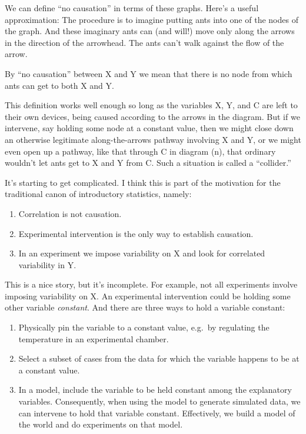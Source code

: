 \documentclass[nofonts,]{tufte-handout}
\providecommand{\tightlist}{%
  \setlength{\itemsep}{0pt}\setlength{\parskip}{0pt}}
\begin{document}
We can define ``no causation'' in terms of these graphs. Here's a useful
approximation: The procedure is to imagine putting ants into one of the
nodes of the graph. And these imaginary ants can (and will!) move only
along the arrows in the direction of the arrowhead. The ants can't walk
against the flow of the arrow.

By ``no causation'' between X and Y we mean that there is no node from
which ants can get to both X and Y.

This definition works well enough so long as the variables X, Y, and C
are left to their own devices, being caused according to the arrows in
the diagram. But if we intervene, say holding some node at a constant
value, then we might close down an otherwise legitimate along-the-arrows
pathway involving X and Y, or we might even open up a pathway, like that
through C in diagram (n), that ordinary wouldn't let ants get to X and Y
from C. Such a situation is called a ``collider.''

It's starting to get complicated. I think this is part of the motivation
for the traditional canon of introductory statistics, namely:

\begin{enumerate}
\def\labelenumi{\arabic{enumi}.}
\tightlist
\item
  Correlation is not causation.
\item
  Experimental intervention is the only way to establish causation.
\item
  In an experiment we impose variability on X and look for correlated
  variability in Y.
\end{enumerate}

This is a nice story, but it's incomplete. For example, not all
experiments involve imposing variability on X. An experimental
intervention could be holding some other variable \emph{constant}. And
there are three ways to hold a variable constant:

\begin{enumerate}
\def\labelenumi{\alph{enumi}.}
\tightlist
\item
  Physically pin the variable to a constant value, e.g.~by regulating
  the temperature in an experimental chamber.
\item
  Select a subset of cases from the data for which the variable happens
  to be at a constant value.
\item
  In a model, include the variable to be held constant among the
  explanatory variables. Consequently, when using the model to generate
  simulated data, we can intervene to hold that variable constant.
  Effectively, we build a model of the world and do experiments on that
  model.
\end{enumerate}
\end{document}
